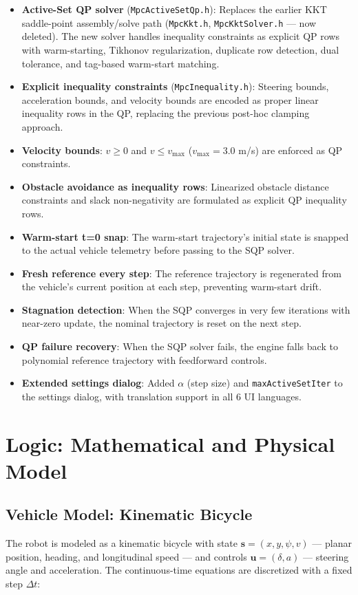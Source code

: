 ﻿\documentclass[11pt,a4paper]{article}
\begin{document}
\begin{itemize}[leftmargin=1.2cm]
  \item \textbf{Active-Set QP solver} (\texttt{MpcActiveSetQp.h}): Replaces the earlier KKT saddle-point assembly/solve path (\texttt{MpcKkt.h}, \texttt{MpcKktSolver.h} --- now deleted). The new solver handles inequality constraints as explicit QP rows with warm-starting, Tikhonov regularization, duplicate row detection, dual tolerance, and tag-based warm-start matching.
  \item \textbf{Explicit inequality constraints} (\texttt{MpcInequality.h}): Steering bounds, acceleration bounds, and velocity bounds are encoded as proper linear inequality rows in the QP, replacing the previous post-hoc clamping approach.
  \item \textbf{Velocity bounds}: $v \geq 0$ and $v \leq v_{\max}$ ($v_{\max} = 3.0$ m/s) are enforced as QP constraints.
  \item \textbf{Obstacle avoidance as inequality rows}: Linearized obstacle distance constraints and slack non-negativity are formulated as explicit QP inequality rows.
  \item \textbf{Warm-start t=0 snap}: The warm-start trajectory's initial state is snapped to the actual vehicle telemetry before passing to the SQP solver.
  \item \textbf{Fresh reference every step}: The reference trajectory is regenerated from the vehicle's current position at each step, preventing warm-start drift.
  \item \textbf{Stagnation detection}: When the SQP converges in very few iterations with near-zero update, the nominal trajectory is reset on the next step.
  \item \textbf{QP failure recovery}: When the SQP solver fails, the engine falls back to polynomial reference trajectory with feedforward controls.
  \item \textbf{Extended settings dialog}: Added $\alpha$ (step size) and \texttt{maxActiveSetIter} to the settings dialog, with translation support in all 6 UI languages.
\end{itemize}
\section{Logic: Mathematical and Physical Model}

\subsection{Vehicle Model: Kinematic Bicycle}
The robot is modeled as a kinematic bicycle with state $\mathbf{s} = (x, y, \psi, v)$ --- planar position, heading, and longitudinal speed --- and controls $\mathbf{u} = (\delta, a)$ --- steering angle and acceleration. The continuous-time equations are discretized with a fixed step $\Delta t$:
\end{document}
